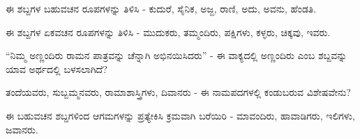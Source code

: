 \vspace{2.5pt plus 3pt minus 0.5pt}\noindent\hspace*{1.2em}\hspace{0.55em}ಈ ಶಬ್ದಗಳ ಬಹುವಚನ ರೂಪಗಳನ್ನು ತಿಳಿಸಿ - ಕುದುರೆ, ಸೈನಿಕ, ಅಜ್ಜ, ರಾಣಿ, ಅದು, ಅವನು, ಹೆಂಡತಿ.\par

\vspace{2.5pt plus 3pt minus 0.5pt}\noindent\hspace*{1.2em}\hspace{0.55em}ಈ ಶಬ್ದಗಳ ಏಕವಚನ ರೂಪಗಳನ್ನು ತಿಳಿಸಿ - ಮುದುಕರು, ತಮ್ಮಂದಿರು, ಪಕ್ಷಿಗಳು, ಕಳ್ಳರು, ಚಿಕ್ಕವು, ಇವರು.\par

\vspace{2.5pt plus 3pt minus 0.5pt}\noindent\hspace*{1.2em}\hspace{0.55em}“ನಿಮ್ಮ ಅಣ್ಣಂದಿರು ರಾಮನ ಪಾತ್ರವನ್ನು ಚೆನ್ನಾಗಿ ಅಭಿನಯಿಸಿದರು” - ಈ ವಾಕ್ಯದಲ್ಲಿ ಅಣ್ಣಂದಿರು ಎಂಬ ಶಬ್ದವನ್ನು ಯಾವ ಅರ್ಥದಲ್ಲಿ ಬಳಸಲಾಗಿದೆ?\par

\vspace{2.5pt plus 3pt minus 0.5pt}\noindent\hspace*{1.2em}\hspace{0.55em}ತಂದೆಯವರು, ಸುಬ್ಬಮ್ಮನವರು, ರಾಮಾಶಾಸ್ತ್ರಿಗಳು, ದಿವಾನರು - ಈ ನಾಮಪದಗಳಲ್ಲಿ ಕಂಡುಬರುವ ವಿಶೇಷವೇನು?\par

\vspace{2.5pt plus 3pt minus 0.5pt}\noindent\hspace*{1.2em}\hspace{0.55em}ಈ ಬಹುವಚನ ಶಬ್ದಗಳಿಂದ ಆಗಮಗಳನ್ನು ಪ್ರತ್ಯೇಕಿಸಿ ಕ್ರಮವಾಗಿ ಬರೆಯಿರಿ - ಮಾವಂದಿರು, ಹಾವಾಡಿಗರು, ಇಲಿಗಳು, ಜವಾನರು.\par
